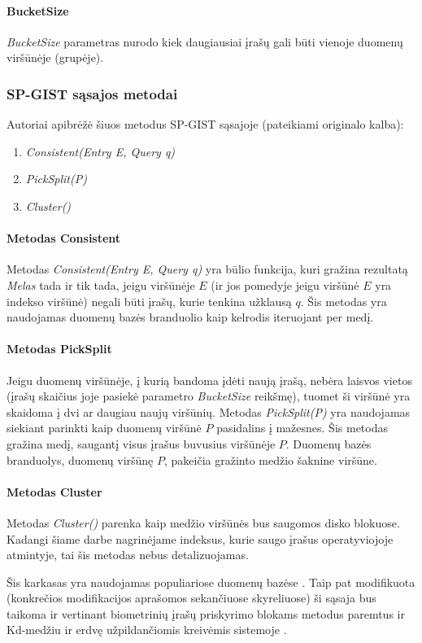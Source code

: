 \paragraph{BucketSize}
{\it BucketSize} parametras nurodo kiek daugiausiai įrašų gali būti vienoje duomenų viršūnėje (grupėje).



\subsubsection{SP-GIST sąsajos metodai}

Autoriai apibrėžė šiuos metodus SP-GIST sąsajoje (pateikiami originalo kalba):
\begin{enumerate}
	\item {\it Consistent(Entry E, Query q)}
	\item {\it PickSplit(P)}
	\item {\it Cluster()}
\end{enumerate}

\paragraph{Metodas Consistent}
Metodas {\it Consistent(Entry E, Query q)} yra būlio funkcija, kuri gražina rezultatą {\it Melas} tada ir tik tada, jeigu viršūnėje $E$ (ir jos pomedyje jeigu viršūnė $E$ yra indekso viršūnė) negali būti įrašų, kurie tenkina užklausą $q$.
Šis metodas yra naudojamas duomenų bazės branduolio kaip kelrodis iteruojant per medį.

\paragraph{Metodas PickSplit}
Jeigu duomenų viršūnėje, į kurią bandoma įdėti naują įrašą, nebėra laisvos vietos (įrašų skaičius joje pasiekė parametro {\it BucketSize} reikšmę), tuomet ši viršūnė yra skaidoma į dvi ar daugiau naujų viršūnių.
Metodas {\it PickSplit(P)} yra naudojamas siekiant parinkti kaip duomenų viršūnė $P$ pasidalins į mažesnes.
Šis metodas gražina medį, saugantį visus įrašus buvusius viršūnėje $P$.
Duomenų bazės branduolys, duomenų viršūnę $P$, pakeičia gražinto medžio šaknine viršūne.

\paragraph{Metodas Cluster}
Metodas {\it Cluster()} parenka kaip medžio viršūnės bus saugomos disko blokuose.
Kadangi šiame darbe nagrinėjame indeksus, kurie saugo įrašus operatyviojoje atmintyje, tai šis metodas nebus detalizuojamas.

Šis karkasas yra naudojamas populiariose duomenų bazėse \cite{eltabakh2006space}.
Taip pat modifikuota (konkrečios modifikacijos aprašomos sekančiuose skyreliuose) ši sąsaja bus taikoma ir vertinant biometrinių įrašų priskyrimo blokams metodus paremtus ir Kd-medžiu ir erdvę užpildančiomis kreivėmis sistemoje \cite{NeurotechnologyMegamatcherAccelerator}.


